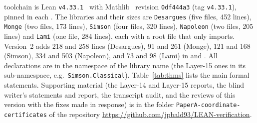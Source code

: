 \documentclass[11pt]{article}
\theoremstyle{definition}
\theoremstyle{remark}
\newcommand{\lean}[1]{\texttt{#1}}
\begin{document}
toolchain is Lean \texttt{v4.33.1}~\cite{Lean4}
with Mathlib~\cite{Mathlib} revision \texttt{0df444a3} (tag \texttt{v4.33.1}), pinned in each
. The libraries and their sizes are \lean{Desargues} (five files,
452 lines), \lean{Monge} (two files, 173 lines), \lean{Simson} (four files, 320 lines),
\lean{Napoleon} (two files, 205 lines) and \lean{Lami} (one file, 284 lines), each with a root file
that only imports. Version~2 adds 218 and 258 lines (Desargues), 91 and 261 (Monge), 121 and 168
(Simson), 334 and 503 (Napoleon), and 73 and 98 (Lami) in  and
. All declarations are in the namespace of the library name (the Layer-15
ones in its sub-namespace, e.g.\ \lean{Simson.Classical}). Table~\ref{tab:thms}
lists the main formal statements.
Supporting material (the Layer-14 and Layer-15 reports, the blind writer's statements and report, the transcript audit, and the reviews of this version with the fixes made in response) is in the folder \texttt{PaperA-coordinate-certificates} of the repository \url{https://github.com/jpbald93/LEAN-verification}.
\end{document}
